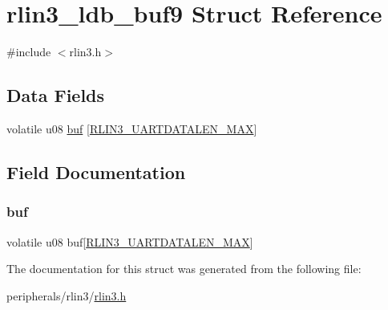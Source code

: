 \hypertarget{structrlin3__ldb__buf9}{}\section{rlin3\+\_\+ldb\+\_\+buf9 Struct Reference}
\label{structrlin3__ldb__buf9}


{\ttfamily \#include $<$rlin3.\+h$>$}

\subsection*{Data Fields}
\begin{DoxyCompactItemize}
\item 
volatile u08 \mbox{\hyperlink{structrlin3__ldb__buf9_a506f671bd45c53b3a0e68a4d1f414cb1}{buf}} \mbox{[}\mbox{\hyperlink{rlin3_8h_a8f1ca01f8466ac78233c1cbf0749608a}{R\+L\+I\+N3\+\_\+\+U\+A\+R\+T\+D\+A\+T\+A\+L\+E\+N\+\_\+\+M\+AX}}\mbox{]}
\end{DoxyCompactItemize}


\subsection{Field Documentation}
\mbox{\label{structrlin3__ldb__buf9_a506f671bd45c53b3a0e68a4d1f414cb1}} 
\subsubsection{\texorpdfstring{buf}{buf}}
{\footnotesize\ttfamily volatile u08 buf\mbox{[}\mbox{\hyperlink{rlin3_8h_a8f1ca01f8466ac78233c1cbf0749608a}{R\+L\+I\+N3\+\_\+\+U\+A\+R\+T\+D\+A\+T\+A\+L\+E\+N\+\_\+\+M\+AX}}\mbox{]}}



The documentation for this struct was generated from the following file\+:\begin{DoxyCompactItemize}
\item 
peripherals/rlin3/\mbox{\hyperlink{rlin3_8h}{rlin3.\+h}}\end{DoxyCompactItemize}
